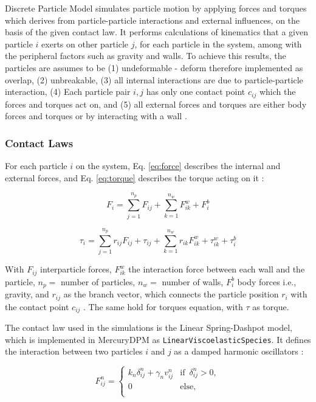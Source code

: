  Discrete Particle Model simulates particle motion by applying forces and torques which derives from particle-particle interactions and external influences, on the basis of the given contact law. It performs calculations of kinematics that a given particle $i$ exerts on other particle $j$, for each particle in the system, among with the peripheral factors such as gravity and walls. To achieve this results, the particles are assumes to be (1) undeformable - deform therefore implemented as overlap, (2) unbreakable, (3) all internal interactions are due to particle-particle interaction, (4) Each particle pair $i, j$ has only one contact point $c_{ij}$ which the forces and torques act on, and (5) all external forces and torques are either body forces and torques or by interacting with a wall \cite{MercuryDPM}. 

\subsubsection{Contact Laws}
For each particle $i$ on the system, Eq. \ref{eq:force} describes the internal and external forces, and Eq. \ref{eq:torque} describes the torque acting on it \cite{MercuryDPM}:

\begin{equation} \label{eq:force}
    F_i = \sum_{j=1}^{n_p} F_{ij} + \sum_{k=1}^{n_w} F_{ik}^w  + F_i^b
\end{equation}

\begin{equation} \label{eq:torque}
    \tau_i = \sum_{j=1}^{n_p} r_{ij}F_{ij} + \tau_{ij} + \sum_{k=1}^{n_w} r_{ik}F_{ik}^w + \tau_{ik}^w +\tau_{i}^{b} 
\end{equation}

With $F_{ij}$ interparticle forces, $F_{ik}^w$ the interaction force between each wall and the particle, $n_p =$ number of particles, $n_w =$ number of walls, $F_i^b$ body forces i.e., gravity, and $r_{ij}$ as the branch vector, which connects the particle position $r_i$ with the contact point $c_{ij}$ . The same hold for torques equation, with $\tau$ as torque. 

The contact law used in the simulations is the Linear Spring-Dashpot model, which is implemented in MercuryDPM as \texttt{LinearViscoelasticSpecies}. It defines the interaction between two particles $i$ and $j$ as a damped harmonic oscillators \cite{LSD-info}:

\begin{equation}
    F_{ij}^n=\begin{cases}
        k_n \delta_{ij}^n + \gamma_n v_{ij}^n &\text{if } \, \delta_{ij}^n > 0, \\
        0 \quad &\text{else, } \,   \\
   \end{cases}
\end{equation}

